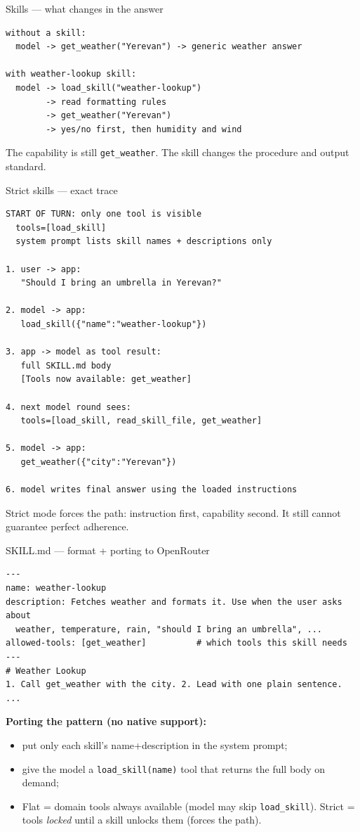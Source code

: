 \documentclass[aspectratio=169,10pt]{beamer}
\begin{document}
\begin{frame}[fragile]{Skills --- what changes in the answer}
\begin{lstlisting}[style=ascii]
without a skill:
  model -> get_weather("Yerevan") -> generic weather answer

with weather-lookup skill:
  model -> load_skill("weather-lookup")
        -> read formatting rules
        -> get_weather("Yerevan")
        -> yes/no first, then humidity and wind
\end{lstlisting}
  \vfill
  \footnotesize The capability is still \texttt{get\_weather}. The skill changes the \alert{procedure and output standard}.
\end{frame}
\begin{frame}[fragile]{Strict skills --- exact trace}
\begin{lstlisting}[style=ascii]
START OF TURN: only one tool is visible
  tools=[load_skill]
  system prompt lists skill names + descriptions only

1. user -> app:
   "Should I bring an umbrella in Yerevan?"

2. model -> app:
   load_skill({"name":"weather-lookup"})

3. app -> model as tool result:
   full SKILL.md body
   [Tools now available: get_weather]

4. next model round sees:
   tools=[load_skill, read_skill_file, get_weather]

5. model -> app:
   get_weather({"city":"Yerevan"})

6. model writes final answer using the loaded instructions
\end{lstlisting}
\footnotesize Strict mode forces the \alert{path}: instruction first, capability second. It still cannot guarantee perfect adherence.
\end{frame}
\begin{frame}[fragile]{SKILL.md --- format + porting to OpenRouter}
\begin{lstlisting}[style=ascii]
---
name: weather-lookup
description: Fetches weather and formats it. Use when the user asks about
  weather, temperature, rain, "should I bring an umbrella", ...
allowed-tools: [get_weather]          # which tools this skill needs
---
# Weather Lookup
1. Call get_weather with the city. 2. Lead with one plain sentence. ...
\end{lstlisting}
  \textbf{Porting the pattern (no native support):}
  \begin{itemize}\footnotesize
    \item put only each skill's \alert{name+description} in the system prompt;
    \item give the model a \alert{\texttt{load\_skill(name)}} tool that returns the full body on demand;
    \item \alert{Flat} = domain tools always available (model may skip \texttt{load\_skill}).
          \alert{Strict} = tools \emph{locked} until a skill unlocks them (forces the path).
  \end{itemize}
\end{frame}
\end{document}
